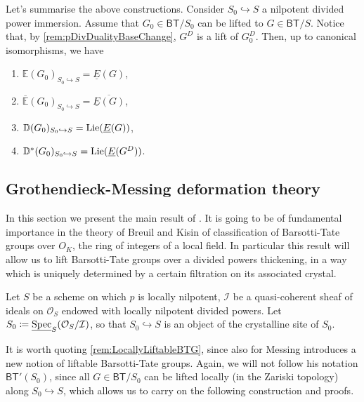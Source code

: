 \begin{rem}[]
	Let's summarise the above constructions.
	Consider $S_0 \hookrightarrow S$ a nilpotent divided power immersion.
	Assume that $G_0 \in \mathsf{BT}/S_0$ can be lifted to $G \in \mathsf{BT}/S$.
	Notice that, by \cref{rem:pDivDualityBaseChange}, $G^D$ is a lift of $G_0^D$.
	Then, up to canonical isomorphisms, we have
\begin{enumerate}
	\item $\mathbb{E}(G_0)_{S_0 \hookrightarrow S} = \underline{E}(G)$,
	\item $\overline{\mathbb{E}}(G_0)_{S_0 \hookrightarrow S} = \overline{\underline{E}(G)}$,
	\item $\mathbb{D}(G_0)_{S_0 \hookrightarrow S} = 
		\operatorname{Lie}(\underline{E}(G))$,
	\item $\mathbb{D}^*(G_0)_{S_0 \hookrightarrow S} = \operatorname{Lie}(\underline{E}(G^D))$.
\end{enumerate}
\end{rem}



\subsection{Grothendieck-Messing deformation theory}
In this section we present the main result of \cite[Chapter V]{Messing}.
It is going to be of fundamental importance in the theory of Breuil and Kisin of
classification of Barsotti-Tate groups over $O_K$, the ring of integers
of a local field.
In particular this result will allow us to lift Barsotti-Tate groups 
over a divided powers thickening, in a way which is uniquely determined by
a certain filtration on its associated crystal.


\begin{ntt}
	Let $S$ be a scheme on which $p$ is locally nilpotent, $\mathcal{I}$
	be a quasi-coherent sheaf of ideals on $\mathcal{O}_{ S }$ endowed
	with locally nilpotent divided powers.
	Let $S_0 \coloneqq \underline{\operatorname{Spec}}_S(\mathcal{O}_{ S }/\mathcal{I})$,
	so that $S_0 \hookrightarrow S$ is an object of the crystalline site of $S_0$.
\end{ntt} 


\begin{rem}[]
	It is worth quoting \cref{rem:LocallyLiftableBTG},
	since also for \cite[Chapter V]{Messing} Messing
	introduces a new notion of liftable Barsotti-Tate groups.
	Again, we will not follow his notation $\mathsf{BT}'(S_0)$,
	since all $G \in \mathsf{BT}/S_0$ can be lifted locally
	(in the Zariski topology) along $S_0 \hookrightarrow S$,
	which allows us to carry on the following construction
	and proofs.
\end{rem}


